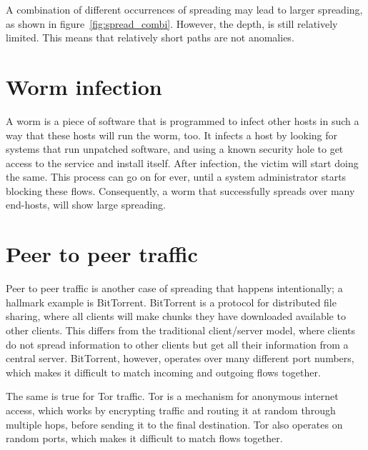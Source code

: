 A combination of different occurrences of spreading may lead to larger spreading, as shown in figure~\ref{fig:spread_combi}.
However, the depth, is still relatively limited.
This means that relatively short paths are not anomalies.


\section{Worm infection}
A worm is a piece of software that is programmed to infect other hosts in such a way that these hosts will run the worm, too.
It infects a host by looking for systems that run unpatched software,
 and using a known security hole to get access to the service and install itself.
After infection, the victim will start doing the same.
This process can go on for ever, until a system administrator starts blocking these flows.
Consequently, a worm that successfully spreads over many end-hosts, will show large spreading.


\section{Peer to peer traffic}
Peer to peer traffic is another case of spreading that happens intentionally;
a hallmark example is BitTorrent.
BitTorrent is a protocol for distributed file sharing, where all clients will make chunks they have downloaded available to other clients.
This differs from the traditional client/server model, where clients do not spread information to other clients but get all their information from a central server.
BitTorrent, however, operates over many different port numbers, which makes it difficult to match incoming and outgoing flows together.

The same is true for Tor traffic.
Tor is a mechanism for anonymous internet access, which works by encrypting traffic and routing it at random through multiple hops,
before sending it to the final destination.
Tor also operates on random ports, which makes it difficult to match flows together.

